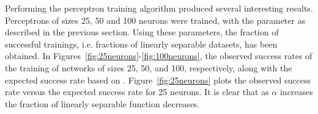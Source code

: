 Performing the perceptron training algorithm produced several interesting results.
Perceptrons of sizes 25, 50 and 100 neurons were trained, with the parameter as described in the previous section. 
Using these parameters, the fraction of successful trainings, i.e. fractions of linearly separable datasets, has been obtained. 
In Figures~\ref{fig:25neurons}-\ref{fig:100neurons}, the observed success rates of the training of networks of sizes 25, 50, and 100, respectively, along with the expected success rate based on \cite{perceptron_slides2}.
Figure~\ref{fig:25neurons} plots the observed success rate versus the expected success rate for 25 neurons.
It is clear that as \(\alpha\) increases the fraction of linearly separable function decreases.
